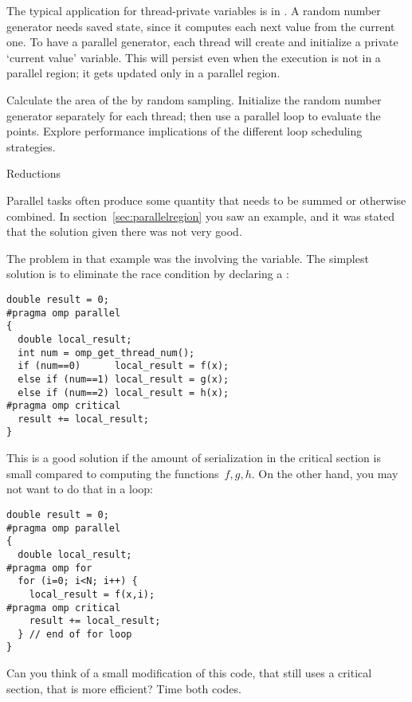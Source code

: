 The typical application for thread-private variables is in
.
A random number generator needs saved state, since it computes each next value
from the current one. To have a parallel generator, each thread will create
and initialize a private `current value' variable. This will persist
even when the execution is not in a parallel region; it gets updated only
in a parallel region.

\begin{exercise}
  \label{ex:random-mandel}
  Calculate the area of the  by random
  sampling. Initialize the random number generator separately for each
  thread; then use a parallel loop to evaluate the points.
  Explore performance implications of the different loop scheduling strategies.
\end{exercise}

 {Reductions}

Parallel tasks often produce some quantity that needs to be summed
or otherwise combined.
In section~\ref{sec:parallelregion} you saw an example, and it was stated that the
solution given there was not very good.

The problem in that example was the  involving the 
variable. The simplest solution is to eliminate the race condition
by declaring a :
\begin{verbatim}
double result = 0;
#pragma omp parallel
{
  double local_result;
  int num = omp_get_thread_num();
  if (num==0)      local_result = f(x);
  else if (num==1) local_result = g(x);
  else if (num==2) local_result = h(x);
#pragma omp critical
  result += local_result;
}
\end{verbatim}

This is a good solution if the amount of serialization in the critical section
is small compared to computing the functions~$f,g,h$. On the other hand, you
may not want to do that in a loop:
\begin{verbatim}
double result = 0;
#pragma omp parallel
{
  double local_result;
#pragma omp for
  for (i=0; i<N; i++) {
    local_result = f(x,i);
#pragma omp critical
    result += local_result;
  } // end of for loop
}
\end{verbatim}
\begin{exercise}
  Can you think of a small modification of this code, that still uses a critical section,
  that is more efficient? Time both codes.
\end{exercise}

